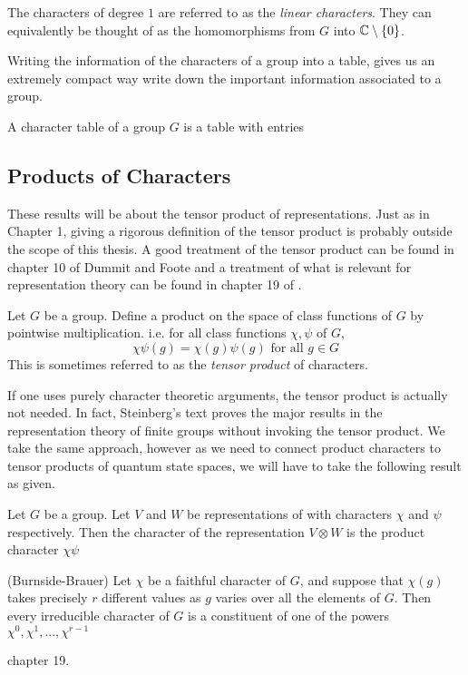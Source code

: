 \begin{definition}
    The characters of degree $1$ are referred to as the \emph{linear characters}. They can equivalently be thought 
    of as the homomorphisms from $G$ into $\mathbb{C}\setminus \{0\}$.
\end{definition}

    
    Writing the information of the characters of a group into a table, gives us an extremely compact way write down 
    the important information associated to a group.

\begin{definition}
    A character table of a group $G$ is a table with entries 
\end{definition}









\subsection{Products of Characters}

These results will be about the tensor product of representations. Just as in Chapter 1, giving a rigorous 
definition of the tensor product is probably outside the scope of this thesis. A good treatment of the tensor 
product can be found in chapter 10 of Dummit and Foote \cite{foote} and a treatment of what is relevant for 
representation theory can be found in chapter 19 of \cite{James&Liebeck}.

\begin{definition}
    Let $G$ be a group. Define a product on the space of class functions of $G$ by pointwise multiplication. i.e.
    for all class functions $\chi, \psi$ of $G$, 
    \[
        \chi\psi(g) = \chi(g)\psi(g) \text{ for all } g \in G
    \]
    This is sometimes referred to as the \emph{tensor product} of characters.
\end{definition}

If one uses purely character theoretic arguments, the tensor product is actually not needed. In fact, Steinberg's 
text \cite{steinberg} proves the major results in the representation theory of finite groups without invoking the 
tensor product. We take the same approach, however as we need to connect product characters to tensor products of 
quantum state spaces, we will have to take the following result as given.

\begin{proposition}
    Let $G$ be a group. Let $V$ and $W$ be representations of with characters $\chi$ and $\psi$ respectively. Then 
    the character of the representation $V \otimes W$ is the product character $\chi\psi$
\end{proposition}


\begin{theorem}\label{thm:Burnside_Brauer}(Burnside-Brauer)
    Let $\chi$ be a faithful character of $G$, and suppose that $\chi(g)$ takes precisely $r$ different values as 
    $g$ varies over all the elements of $G$. Then every irreducible character of $G$ is a constituent of one of the 
    powers $\chi^0, \chi^1, ... , \chi^{r-1}$
\end{theorem}
\cite{James&Liebeck} chapter 19.
